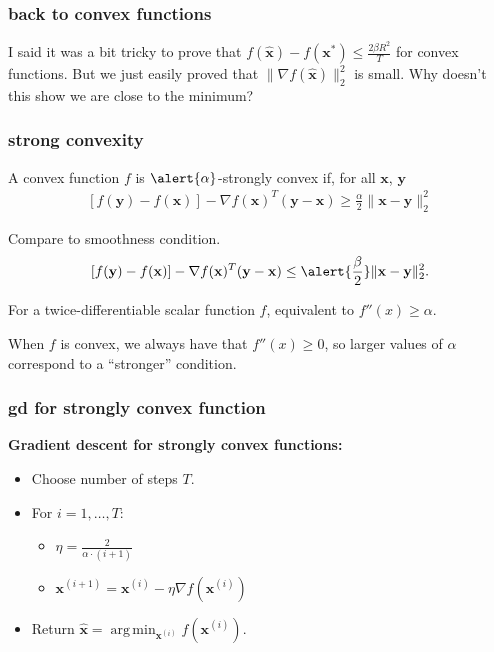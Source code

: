 \documentclass[compress]{beamer}
\newcommand{\bv}[1]{\mathbf{#1}}
\DeclareMathOperator*{\argmin}{arg\,min}
\begin{document}
\begin{frame}[t]
	\frametitle{back to convex functions}
	I said it was a bit tricky to prove that $f(\hat{\bv{x}}) - f(\bv{x}^*) \leq \frac{2\beta R^2}{T}$ for convex functions. But we just easily proved that $\|\nabla f(\hat{\bv{x}})\|_2^2$ is small. Why doesn't this show we are close to the minimum?
	
\end{frame}

\begin{frame}[t]
	\frametitle{strong convexity}
	\begin{definition}
		A convex function $f$ is $\alert{\alpha}$-strongly convex if, for all $\bv{x}$, $\bv{y}$
		\begin{align*}
			\left[f(\bv{y}) - f(\bv{x})\right] - \nabla f(\bv{x})^T(\bv{y} - \bv{x}) \geq \frac{\alpha}{2}\|\bv{x} - \bv{y}\|_2^2 
		\end{align*}
	\end{definition}
	Compare to smoothness condition.
	$$\left[f(\bv{y}) - f(\bv{x})\right] - \nabla f(\bv{x})^T(\bv{y} - \bv{x}) \leq \alert{\frac{\beta}{2}}\|\bv{x} - \bv{y}\|_2^2.$$
	
	\vspace{1em}
	For a twice-differentiable scalar function $f$, equivalent to $f''(x) \geq \alpha$.  
	
	\vspace{1em}
	When $f$ is convex, we always have that $f''(x)\geq 0$, so larger values of $\alpha$ correspond to a ``stronger'' condition.
\end{frame}



\begin{frame}[t]
	\frametitle{gd for strongly convex function}
	\textbf{Gradient descent for strongly convex functions:}
	\begin{itemize}
		\item Choose number of steps $T$.
		\item For $i = 1,\ldots, T$:
		\begin{itemize}
			\item $\eta = \frac{2}{\alpha\cdot(i+1)}$
			\item $\bv{x}^{(i+1)} = \bv{x}^{(i)} - \eta \nabla f(\bv{x}^{(i)})$
		\end{itemize}
		\item Return $\hat{\bv{x}} = \argmin_{\bv{x}^{(i)}} f(\bv{x}^{(i)})$. 
	\end{itemize}
\end{frame}
\end{document}
